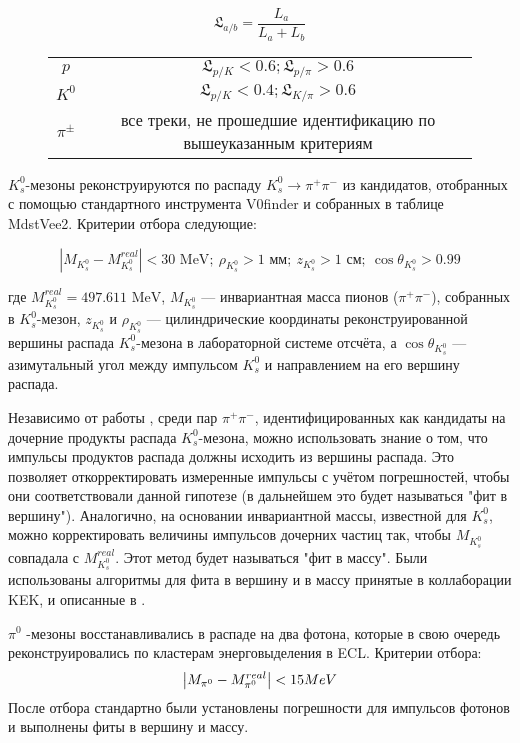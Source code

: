 $$\mathfrak{L}_{a/b} = \frac{L_a}{L_a + L_b}$$

\begin{figure}[h]
    \centering
    \begin{tabular}{c|c}
        $p$   & $\mathfrak{L}_{p/K} < 0.6; \mathfrak{L}_{p/\pi} > 0.6$ \\
        $K^0$   & $\mathfrak{L}_{p/K} < 0.4; \mathfrak{L}_{K/\pi} > 0.6$ \\
        $\pi^{\pm}$ & все треки, не прошедшие идентификацию по вышеуказанным критериям
    \end{tabular}
\end{figure}

\newdot $K_s^0$-мезоны реконструируются по распаду $K_s^0 \to \pi^+ \pi^-$ из кандидатов, отобранных с помощью стандартного инструмента V0finder и собранных в таблице MdstVee2. Критерии отбора следующие:

$$
\left| M_{K_s^0} - M^{real}_{K_s^0} \right| < 30 \text{ MeV}; \ \rho_{K_s^0} > 1 \text{ мм}; \ z_{K_s^0} > 1 \text{ см}; \ \cos \theta_{K_s^0} > 0.99
$$

где $M^{real}_{K_s^0} = 497.611 \text{ MeV}$, $M_{K_s^0}$ — инвариантная масса пионов ($\pi^+ \pi^-$), собранных в $K_s^0$-мезон, $z_{K_s^0}$ и $\rho_{K_s^0}$ — цилиндрические координаты реконструированной вершины распада $K_s^0$-мезона в лабораторной системе отсчёта, а $\cos \theta_{K_s^0}$ — азимутальный угол между импульсом $K_s^0$ и направлением на его вершину распада.

Независимо от работы \cite{BelleDetector2002}, среди пар $\pi^+ \pi^-$, 
идентифицированных как кандидаты на дочерние продукты распада $K_s^0$-мезона, 
можно использовать знание о том, что импульсы продуктов распада должны исходить 
из вершины распада. Это позволяет откорректировать измеренные импульсы с учётом 
погрешностей, чтобы они соответствовали данной гипотезе (в дальнейшем это будет 
называться "фит в вершину"). Аналогично, на основании инвариантной массы, 
известной для $K_s^0$, можно корректировать величины импульсов дочерних частиц 
так, чтобы $M_{K_s^0}$ совпадала с $M^{real}_{K_s^0}$. Этот метод будет 
называться "фит в массу". Были использованы алгоритмы для фита в вершину и 
в массу принятые в коллаборации KEK, и описанные в \cite{Krohn2021}.

\newdot $\pi^0$ -мезоны восстанавливались в распаде на два фотона, которые в
свою очередь реконструировались по кластерам энерговыделения в ECL.
Критерии отбора:
$$
\abs{M_{\pi^0} - M_{\pi^0}^{real}} < 15 MeV 
$$
После отбора стандартно были установлены погрешности для импульсов фотонов и выполнены фиты в вершину и массу.

